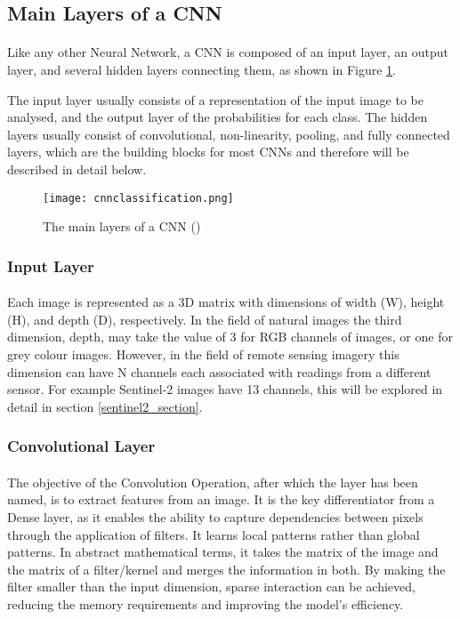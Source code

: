 \subsection{Main Layers of a \gls{CNN}} \label{cnn_layers}
\paragraph{}
Like any other Neural Network, a \gls{CNN} is composed of an input layer, an output layer, and several hidden layers connecting them, as shown in Figure \ref{fig_cnn_layers}.

The input layer usually consists of a representation of the input image to be analysed, and the output layer of the probabilities for each class.
The hidden layers usually consist of convolutional, non-linearity, pooling, and fully connected layers, which are the building blocks for most \gls{CNN}s and therefore will be described in detail below.

    \begin{figure}[hbt!]
        \centering
        \texttt{[image: cnnclassification.png]}
        \caption{The main layers of a \gls{CNN} (\cite{10.6109/JICCE.2018.16.3.173})}
        \label{fig_cnn_layers}
    \end{figure}

\subsubsection{Input Layer}
\paragraph{}
Each image is represented as a 3D matrix with dimensions of  width (W), height (H), and depth (D), respectively. In the field of natural images the third dimension, depth, may take the value of 3 for \gls{RGB} channels of images, or one for grey colour images. However, in the field of remote sensing imagery this dimension can have N channels each associated with readings from a different sensor. For example Sentinel-2 images have 13 channels, this will be explored in detail in section \ref{sentinel2_section}. 

\subsubsection{Convolutional Layer}
\paragraph{}
The objective of the Convolution Operation, after which the layer has been named, is to extract features from an image. It is the key differentiator from a Dense layer, as it enables the ability to capture dependencies between pixels through the application of filters. It learns local patterns rather than global patterns.
In abstract mathematical terms, it takes the matrix of the image and the matrix of a filter/kernel and merges the information in both. By making the filter smaller than the input dimension, sparse interaction can be achieved, reducing the memory requirements and improving the model's  efficiency.

